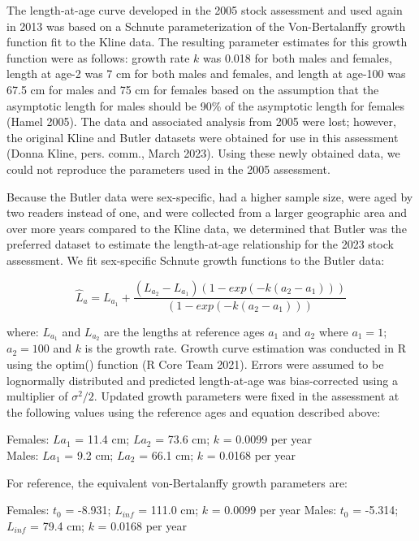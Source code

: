\documentclass[11pt,
  letterpaper,
]{article}
\begin{document}
The length-at-age curve developed in the 2005 stock assessment and used again in 2013 was based on a Schnute parameterization of the Von-Bertalanffy growth function fit to the Kline data. The resulting parameter estimates for this growth function were as follows: growth rate \(k\) was 0.018 for both males and females, length at age-2 was 7 cm for both males and females, and length at age-100 was 67.5 cm for males and 75 cm for females based on the assumption that the asymptotic length for males should be 90\% of the asymptotic length for females (Hamel 2005). The data and associated analysis from 2005 were lost; however, the original Kline and Butler datasets were obtained for use in this assessment (Donna Kline, pers. comm., March 2023). Using these newly obtained data, we could not reproduce the parameters used in the 2005 assessment.

Because the Butler data were sex-specific, had a higher sample size, were aged by two readers instead of one, and were collected from a larger geographic area and over more years compared to the Kline data, we determined that Butler was the preferred dataset to estimate the length-at-age relationship for the 2023 stock assessment. We fit sex-specific Schnute growth functions to the Butler data:

\begin{equation} \hat{L}_{a} = L_{a_{1}}+\frac{(L_{a_{2}}-L_{a_{1}})(1-exp(-k(a_{2}-a_{1})))}{(1-exp(-k(a_{2}-a_{1})))}\end{equation}

where: \(L_{a_{1}}\) and \(L_{a_{2}}\) are the lengths at reference ages \(a_{1}\) and \(a_{2}\) where \(a_{1}=1\); \(a_{2}=100\) and \(k\) is the growth rate. Growth curve estimation was conducted in R using the optim() function (R Core Team 2021). Errors were assumed to be lognormally distributed and predicted length-at-age was bias-corrected using a multiplier of \(\sigma^2/2\). Updated growth parameters were fixed in the assessment at the following values using the reference ages and equation described above:

Females: \(L{a_{1}}\) = 11.4 cm; \(L{a_{2}}\) = 73.6 cm; \(k\) = 0.0099 per year\\
Males: \(L{a_{1}}\) = 9.2 cm; \(L{a_{2}}\) = 66.1 cm; \(k\) = 0.0168 per year

For reference, the equivalent von-Bertalanffy growth parameters are:

Females: \(t{_0}\) = -8.931; \(L{_{inf}}\) = 111.0 cm; \(k\) = 0.0099 per year Males: \(t{_0}\) = -5.314; \(L{_{inf}}\) = 79.4 cm; \(k\) = 0.0168 per year
\end{document}
